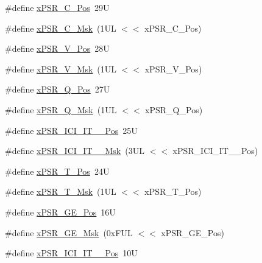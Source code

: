 \begin{DoxyCompactItemize}
\#define \mbox{\hyperlink{group___c_m_s_i_s___c_o_r_e_ga14adb79b91f6634b351a1b57394e2db6}{x\+P\+S\+R\+\_\+\+C\+\_\+\+Pos}}~29U
\item 
\#define \mbox{\hyperlink{group___c_m_s_i_s___c_o_r_e_ga21e2497255d380f956ca0f48d11d0775}{x\+P\+S\+R\+\_\+\+C\+\_\+\+Msk}}~(1\+U\+L $<$$<$ x\+P\+S\+R\+\_\+\+C\+\_\+\+Pos)
\item 
\#define \mbox{\hyperlink{group___c_m_s_i_s___c_o_r_e_gae0cfbb394490db402623d97e6a979e00}{x\+P\+S\+R\+\_\+\+V\+\_\+\+Pos}}~28U
\item 
\#define \mbox{\hyperlink{group___c_m_s_i_s___c_o_r_e_gab07f94ed3b6ee695f5af719dc27995c2}{x\+P\+S\+R\+\_\+\+V\+\_\+\+Msk}}~(1\+U\+L $<$$<$ x\+P\+S\+R\+\_\+\+V\+\_\+\+Pos)
\item 
\#define \mbox{\hyperlink{group___c_m_s_i_s___c_o_r_e_gaabb4178d50676a8f19cf8f727f38ace8}{x\+P\+S\+R\+\_\+\+Q\+\_\+\+Pos}}~27U
\item 
\#define \mbox{\hyperlink{group___c_m_s_i_s___c_o_r_e_ga133ac393c38559ae43ac36383e731dd4}{x\+P\+S\+R\+\_\+\+Q\+\_\+\+Msk}}~(1\+U\+L $<$$<$ x\+P\+S\+R\+\_\+\+Q\+\_\+\+Pos)
\item 
\#define \mbox{\hyperlink{group___c_m_s_i_s___c_o_r_e_gaffb36d1bb0280b1caafcf9b00f6a6da0}{x\+P\+S\+R\+\_\+\+I\+C\+I\+\_\+\+I\+T\+\_\+\_\+\+Pos}}~25U
\item 
\#define \mbox{\hyperlink{group___c_m_s_i_s___c_o_r_e_gaa47c89b028499f8d9ebe6d554439a2b3}{x\+P\+S\+R\+\_\+\+I\+C\+I\+\_\+\+I\+T\+\_\+\_\+\+Msk}}~(3\+U\+L $<$$<$ x\+P\+S\+R\+\_\+\+I\+C\+I\+\_\+\+I\+T\+\_\+\_\+\+Pos)
\item 
\#define \mbox{\hyperlink{group___c_m_s_i_s___c_o_r_e_ga98d801da9a49cda944f52aeae104dd38}{x\+P\+S\+R\+\_\+\+T\+\_\+\+Pos}}~24U
\item 
\#define \mbox{\hyperlink{group___c_m_s_i_s___c_o_r_e_ga30ae2111816e82d47636a8d4577eb6ee}{x\+P\+S\+R\+\_\+\+T\+\_\+\+Msk}}~(1\+U\+L $<$$<$ x\+P\+S\+R\+\_\+\+T\+\_\+\+Pos)
\item 
\#define \mbox{\hyperlink{group___c_m_s_i_s___c_o_r_e_gae2b0f3def0f378e9f1d10a4c727a064b}{x\+P\+S\+R\+\_\+\+G\+E\+\_\+\+Pos}}~16U
\item 
\#define \mbox{\hyperlink{group___c_m_s_i_s___c_o_r_e_ga967634e605d013e9b07002eca31f7903}{x\+P\+S\+R\+\_\+\+G\+E\+\_\+\+Msk}}~(0x\+F\+U\+L $<$$<$ x\+P\+S\+R\+\_\+\+G\+E\+\_\+\+Pos)
\item 
\#define \mbox{\hyperlink{group___c_m_s_i_s___c_o_r_e_gafdcd08cbd7116d65ae1a5b8182dc55ae}{x\+P\+S\+R\+\_\+\+I\+C\+I\+\_\+\+I\+T\+\_\+\_\+\+Pos}}~10U
\item 

\end{DoxyCompactItemize}

